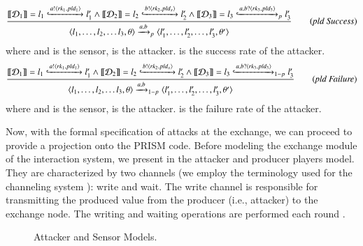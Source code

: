 \begin{boxD}
	      \begin{equation}\frac{ \sset{\mathcal{D}_{1}}= l_{1}\gparrow{a!\gl{rk_{1},pld_{1}}}l'_{1} \wedge \sset{\mathcal{D}_{2}}=  l_{2}\gparrow{b!\gl{rk_{2},pld_{x}} }l'_{2} \wedge
        \sset{\mathcal{D}_{3}}=  l_{3}\gparrow{a, b?\gl{rk_{3},pld_{3}}}_{p}l'_{3}      
       } {  \langle l_{1},\ldots,l_{2},\ldots l_{3},\theta\rangle  \xrightarrow{a,b}_{p}\langle l'_{1},\ldots,l'_{2},\ldots,l'_{3},\theta'\rangle } \label{pld Success} \tag{\emph{pld Success}} \end{equation} where  and  is the sensor,  is the attacker.  is the success rate of the attacker.
	      \begin{equation}\frac{\sset{\mathcal{D}_{1}}= l_{1}\gparrow{a!\gl{rk_{1},pld_{1}}}l'_{1} \wedge \sset{\mathcal{D}_{2}}= l_{2}\gparrow{b!\gl{rk_{2},pld_{x}} }l'_{2} \wedge
        \sset{\mathcal{D}_{3}}=  l_{3}\gparrow{a, b?\gl{rk_{3},pld_{3}}}_{1-p}l'_{3}       
       } {  \langle l_{1},\ldots,l_{2},\ldots l_{3},\theta\rangle  \xrightarrow{a,b}_{1-p}\langle l'_{1},\ldots,l'_{2},\ldots,l'_{3},\theta'\rangle } \label{pld Failure}  \tag{\emph{pld Failure}} \end{equation} where  and  is the sensor,  is the attacker.  is the failure rate of the attacker.
\end{boxD}

Now, with the formal specification of attacks at the exchange, we can proceed to provide a projection onto the PRISM code. Before modeling the exchange module of the interaction system, we present in  the attacker and producer players model. They are characterized by two channels (we employ the terminology used for the channeling system \cite{baierprinciples2008}): write and wait. The write channel is responsible for transmitting the produced value from the producer (i.e., attacker) to the exchange node. The writing and waiting operations are performed each round . 

\noindent
\begin{figure}[!htb]
    \centering
    
    \caption{Attacker and Sensor Models.}
    \label{fig:attack:sensor}
\end{figure} 


